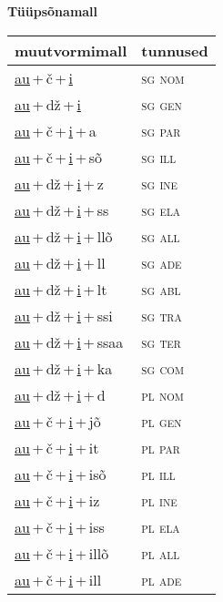 
\vspace{1.8em}
\begin{minipage}{\textwidth}
\textbf{Tüüpsõnamall \,}\\

\begin{sideways}
\begin{tabular}{l l}
muutvormimall & tunnused \\
\hline
\underline{au}\,+\,č\,+\,\underline{i} & \textsc{ sg nom } \\
\underline{au}\,+\,dž\,+\,\underline{i} & \textsc{ sg gen } \\
\underline{au}\,+\,č\,+\,\underline{i}\,+\,a & \textsc{ sg par } \\
\underline{au}\,+\,č\,+\,\underline{i}\,+\,sõ & \textsc{ sg ill } \\
\underline{au}\,+\,dž\,+\,\underline{i}\,+\,z & \textsc{ sg ine } \\
\underline{au}\,+\,dž\,+\,\underline{i}\,+\,ss & \textsc{ sg ela } \\
\underline{au}\,+\,dž\,+\,\underline{i}\,+\,llõ & \textsc{ sg all } \\
\underline{au}\,+\,dž\,+\,\underline{i}\,+\,ll & \textsc{ sg ade } \\
\underline{au}\,+\,dž\,+\,\underline{i}\,+\,lt & \textsc{ sg abl } \\
\underline{au}\,+\,dž\,+\,\underline{i}\,+\,ssi & \textsc{ sg tra } \\
\underline{au}\,+\,dž\,+\,\underline{i}\,+\,ssaa & \textsc{ sg ter } \\
\underline{au}\,+\,dž\,+\,\underline{i}\,+\,ka & \textsc{ sg com } \\
\underline{au}\,+\,dž\,+\,\underline{i}\,+\,d & \textsc{ pl nom } \\
\underline{au}\,+\,č\,+\,\underline{i}\,+\,jõ & \textsc{ pl gen } \\
\underline{au}\,+\,č\,+\,\underline{i}\,+\,it & \textsc{ pl par } \\
\underline{au}\,+\,č\,+\,\underline{i}\,+\,isõ & \textsc{ pl ill } \\
\underline{au}\,+\,č\,+\,\underline{i}\,+\,iz & \textsc{ pl ine } \\
\underline{au}\,+\,č\,+\,\underline{i}\,+\,iss & \textsc{ pl ela } \\
\underline{au}\,+\,č\,+\,\underline{i}\,+\,illõ & \textsc{ pl all } \\
\underline{au}\,+\,č\,+\,\underline{i}\,+\,ill & \textsc{ pl ade } \\

\end{tabular}
\end{sideways}
\end{minipage}
